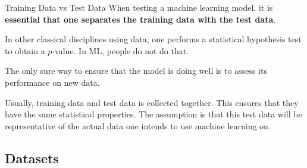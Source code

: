 \begin{frame}[allowframebreaks]

\begin{myconceptblock}{3.19}{Training Data vs Test Data}
    When testing a machine learning model, it is \textbf{essential that one separates the training data with the test data}.

    In other classical disciplines using data, one performs a statistical hypothesis test to obtain a $p$-value. In ML, people do not do that.

    The only sure way to ensure that the model is doing well is to assess its performance on new data.

    Usually, training data and test data is collected together. This ensures that they have the same statistical properties. The assumption is that this test data will be representative of the actual data one intends to use machine learning on.
\end{myconceptblock}

\end{frame}

\subsection{Datasets}

